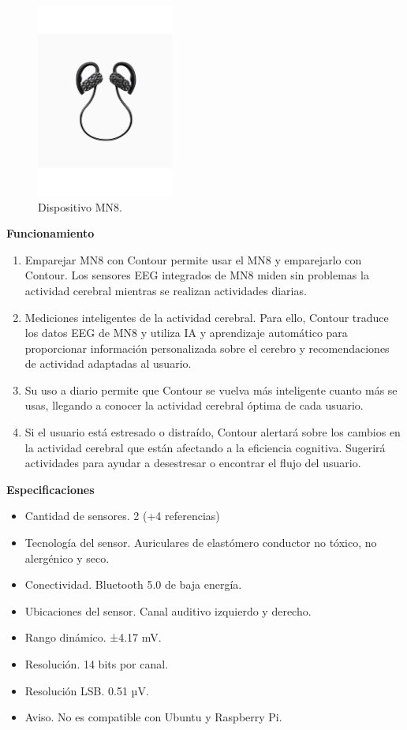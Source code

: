 \begin{figure}[H]
    \centering
    \includegraphics[width=0.4\textwidth]{img/MN8.pdf}
    \caption{Dispositivo MN8.}
    \label{fig: MN8}
\end{figure}

\textbf{Funcionamiento}
\begin{enumerate}
    \item Emparejar MN8 con Contour permite usar el MN8 y emparejarlo con Contour. Los sensores EEG integrados de MN8 miden sin problemas la actividad cerebral mientras se realizan actividades diarias.
    \item Mediciones inteligentes de la actividad cerebral. Para ello, Contour traduce los datos EEG de MN8 y utiliza IA y aprendizaje automático para proporcionar información personalizada sobre el cerebro y recomendaciones de actividad adaptadas al usuario.
    \item Su uso a diario permite que Contour se vuelva más inteligente cuanto más se usas, llegando a conocer la actividad cerebral óptima de cada usuario.
    \item Si el usuario está estresado o distraído, Contour alertará sobre los cambios en la actividad cerebral que están afectando a la eficiencia cognitiva. Sugerirá actividades para ayudar a desestresar o encontrar el flujo del usuario.
\end{enumerate}

\textbf{Especificaciones}
\begin{itemize}
    \item Cantidad de sensores. 2 (+4 referencias)
    \item Tecnología del sensor. Auriculares de elastómero conductor no tóxico, no alergénico y seco.
    \item Conectividad. Bluetooth 5.0 de baja energía.
    \item Ubicaciones del sensor. Canal auditivo izquierdo y derecho.
    \item Rango dinámico. ±4.17 mV.
    \item Resolución. 14 bits por canal.
    \item Resolución LSB. 0.51 µV.
    \item Aviso. No es compatible con Ubuntu y Raspberry Pi.
\end{itemize}

